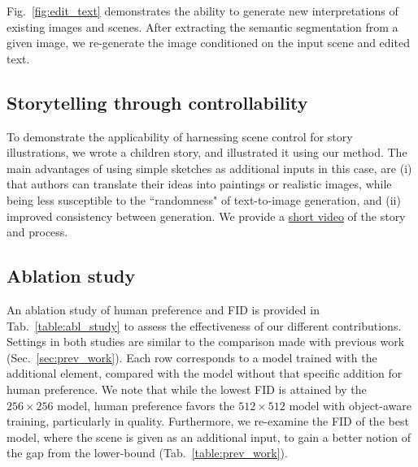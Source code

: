 \documentclass[final]{cvpr}
\begin{document}
Fig.~\ref{fig:edit_text} demonstrates the ability to generate new interpretations of existing images and scenes. After extracting the semantic segmentation from a given image, we re-generate the image conditioned on the input scene and edited text.

\subsection{Storytelling through controllability} 
To demonstrate the applicability of harnessing scene control for story illustrations, we wrote a children story, and illustrated it using our method. The main advantages of using simple sketches as additional inputs in this case, are (i) that authors can translate their ideas into paintings or realistic images, while being less susceptible to the ``randomness" of text-to-image generation, and (ii) improved consistency between generation. We provide a \href{https://youtu.be/QLTyqoJJKTo}{short video} of the story and process.

\subsection{Ablation study}
An ablation study of human preference and FID is provided in Tab.~\ref{table:abl_study} to assess the effectiveness of our different contributions. Settings in both studies are similar to the comparison made with previous work (Sec.~\ref{sec:prev_work}). Each row corresponds to a model trained with the additional element, compared with the model without that specific addition for human preference. We note that while the lowest FID is attained by the $256\times256$ model, human preference favors the $512\times512$ model with object-aware training, particularly in quality. Furthermore, we re-examine the FID of the best model, where the scene is given as an additional input, to gain a better notion of the gap from the lower-bound (Tab.~\ref{table:prev_work}).
\end{document}
